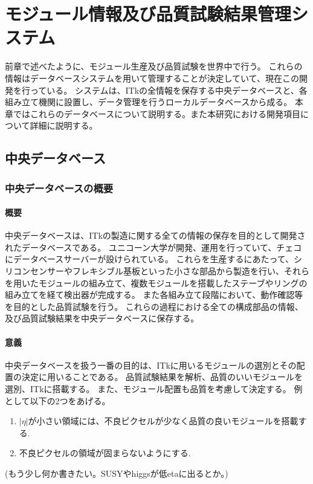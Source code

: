 \chapter{モジュール情報及び品質試験結果管理システム}\label{chap:dbsystem}
前章で述べたように、モジュール生産及び品質試験を世界中で行う。
これらの情報はデータベースシステムを用いて管理することが決定していて、現在この開発を行っている。
システムは、ITkの全情報を保存する中央データベースと、各組み立て機関に設置し、データ管理を行うローカルデータベースから成る。
本章ではこれらのデータベースについて説明する。また本研究における開発項目について詳細に説明する。

\section{中央データベース}
\subsection{中央データベースの概要}
\subsubsection{概要}
中央データベースは、ITkの製造に関する全ての情報の保存を目的として開発されたデータベースである。
ユニコーン大学が開発、運用を行っていて、チェコにデータベースサーバーが設けられている。
これらを生産するにあたって、シリコンセンサーやフレキシブル基板といった小さな部品から製造を行い、それらを用いたモジュールの組み立て、複数モジュールを搭載したステーブやリングの組み立てを経て検出器が完成する。
また各組み立て段階において、動作確認等を目的とした品質試験を行う。
これらの過程における全ての構成部品の情報、及び品質試験結果を中央データベースに保存する。

\subsubsection{意義}
中央データベースを扱う一番の目的は、ITkに用いるモジュールの選別とその配置の決定に用いることである。
品質試験結果を解析、品質のいいモジュールを選別、ITkに搭載する。
また、モジュール配置も品質を考慮して決定する。
例として以下の2つをあげる。
\begin{enumerate}
  \item $|\eta|$が小さい領域には、不良ピクセルが少なく品質の良いモジュールを搭載する.
  \item 不良ピクセルの領域が固まらないようにする.
\end{enumerate}
(もう少し何か書きたい。SUSYやhiggsが低etaに出るとか。)

